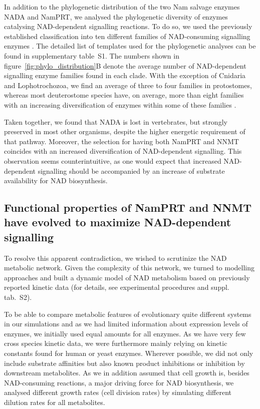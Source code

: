 In addition to the phylogenetic distribution of the two Nam salvage enzymes NADA and NamPRT, we analysed the phylogenetic diversity of enzymes catalysing NAD-dependent signalling reactions. To do so, we used the previously established classification into ten different families of NAD-consuming signalling enzymes \cite{Gossmann2012FEBS}. The detailed list of templates used for the phylogenetic analyses can be found in supplementary table~S1. The numbers shown in figure~\ref{fig:phylo_distribution}B denote the average number of NAD-dependent signalling enzyme families found in each clade. With the exception of Cnidaria and Lophotrochozoa, we find an average of three to four families in protostomes, whereas most deuterostome species have, on average, more than eight families with an increasing diversification of enzymes within some of these families \cite{Gossmann2014DNAR}.

Taken together, we found that NADA is lost in vertebrates, but strongly preserved in most other organisms, despite the higher energetic requirement of that pathway. Moreover, the selection for having both NamPRT and NNMT coincides with an increased diversification of NAD-dependent signalling. This observation seems counterintuitive, as one would expect that increased NAD-dependent signalling should be accompanied by an increase of substrate availability for NAD biosynthesis.


\subsection{Functional properties of NamPRT and NNMT have evolved to maximize NAD-dependent signalling}

To resolve this apparent contradiction, we wished to scrutinize the NAD metabolic network. Given the complexity of this network, we turned to modelling approaches and built a dynamic model of NAD metabolism based on previously reported kinetic data (for details, see experimental procedures and suppl. tab.~S2).

To be able to compare metabolic features of evolutionary quite different systems in our simulations and as we had limited information about expression levels of enzymes, we initially used equal amounts for all enzymes. As we have very few cross species kinetic data, we were furthermore mainly relying on kinetic constants found for human or yeast enzymes. Wherever possible, we did not only include substrate affinities but also known product inhibitions or inhibition by downstream metabolites. As we in addition assumed that cell growth is, besides NAD-consuming reactions, a major driving force for NAD biosynthesis, we analysed different growth rates (cell division rates) by simulating different dilution rates for all metabolites.

